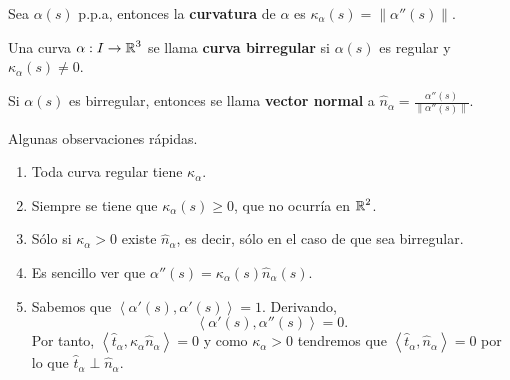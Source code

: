 \begin{definition}[Curvatura]
Sea $\displaystyle \alpha\left(s\right) $ p.p.a, entonces la \textbf{curvatura} de $\displaystyle \alpha  $ es $\displaystyle \kappa_{\alpha }\left(s\right)=\|\alpha''\left(s\right)\| $. 
\end{definition}
\begin{definition}
Una curva $\displaystyle \alpha: I \to \mathbb{R}^{3} $ se llama \textbf{curva birregular} si $\displaystyle \alpha\left(s\right) $ es regular y $\displaystyle \kappa_{\alpha }\left(s\right)\neq 0 $.
\end{definition}
\begin{definition}
Si $\displaystyle \alpha\left(s\right) $ es birregular, entonces se llama \textbf{vector normal} a $\displaystyle \hat{n}_{\alpha }=\frac{\alpha''\left(s\right)}{\|\alpha''\left(s\right)\|} $. 
\end{definition}
\begin{observation} Algunas observaciones rápidas.
\begin{enumerate}
\item Toda curva regular tiene $\displaystyle \kappa_{\alpha } $. 
\item Siempre se tiene que $\displaystyle \kappa_{\alpha }\left(s\right)\geq 0 $, que no ocurría en $\displaystyle \mathbb{R}^{2} $. 
\item Sólo si $\displaystyle \kappa_{\alpha}>0 $ existe $\displaystyle \hat{n}_{\alpha } $, es decir, sólo en el caso de que sea birregular. 
\item Es sencillo ver que $\displaystyle \alpha''\left(s\right)=\kappa_{\alpha }\left(s\right)\hat{n}_{\alpha }\left(s\right) $. 
\item Sabemos que $\displaystyle \left\langle \alpha'\left(s\right), \alpha'\left(s\right) \right\rangle =1 $. Derivando, 
	\[\left\langle \alpha'\left(s\right), \alpha''\left(s\right) \right\rangle  =0.\]
Por tanto, $\displaystyle \left\langle \hat{t}_{\alpha }, \kappa_{\alpha }\hat{n}_{\alpha } \right\rangle = 0 $ y como $\displaystyle \kappa_{\alpha } > 0 $ tendremos que $\displaystyle \left\langle \hat{t}_{\alpha }, \hat{n}_{\alpha } \right\rangle =0 $ por lo que $\displaystyle \hat{t}_{\alpha }\perp \hat{n}_{\alpha} $. 	
\end{enumerate}
\end{observation}
